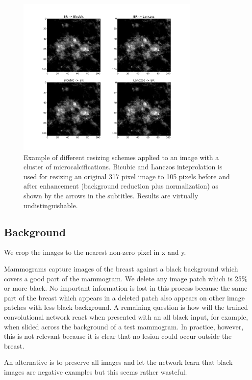 \begin{figure}
	\centering
	\includegraphics [width = 0.8\textwidth]{plots/mcDiffResizings.png}
	\caption[Example of resizing schemes]{Example of different resizing schemes applied to an image with a cluster of microcalcifications. Bicubic and Lanczos inteprolation is used for resizing an original 317 pixel image to 105 pixels before and after enhancement (background reduction plus normalization) as shown by the arrows in the subtitles. Results are virtually undistinguishable.}
	\label{fig:ResizingInterps}
\end{figure}

\subsection{Background}
We crop the images to the nearest non-zero pixel in x and y.


Mammograms capture images of the breast against a black background which covers a good part of the mammogram. We delete any image patch which is 25\% or more black. No important information is lost in this process because the same part of the breast which appears in a deleted patch also appears on other image patches with less black background. A remaining question is how will the trained convolutional network react when presented with an all black input, for example, when slided across the background of a test mammogram. In practice, however, this is not relevant because it is clear that no lesion could occur outside the breast. 

An alternative is to preserve all images and let the network learn that black images are negative examples but this seems rather wasteful.

